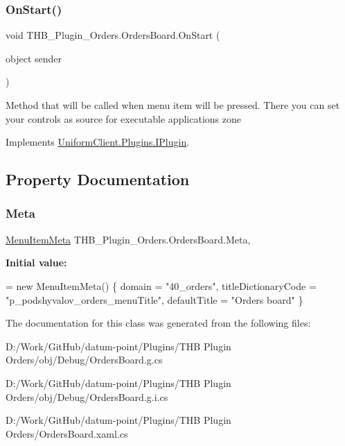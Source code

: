 \subsubsection{\texorpdfstring{On\+Start()}{OnStart()}}
{\footnotesize\ttfamily void T\+H\+B\+\_\+\+Plugin\+\_\+\+Orders.\+Orders\+Board.\+On\+Start (\begin{DoxyParamCaption}\item[{object}]{sender }\end{DoxyParamCaption})}



Method that will be called when menu item will be pressed. There you can set your controls as source for executable application\textquotesingle{}s zone 



Implements \mbox{\hyperlink{interface_uniform_client_1_1_plugins_1_1_i_plugin_a1ca2220c7ce4a23f8f41af10efccf328}{Uniform\+Client.\+Plugins.\+I\+Plugin}}.



\subsection{Property Documentation}
\mbox{\label{class_t_h_b___plugin___orders_1_1_orders_board_a29aa5cbda92c3d6558e51a51c687d4a1}} 
\subsubsection{\texorpdfstring{Meta}{Meta}}
{\footnotesize\ttfamily \mbox{\hyperlink{class_uniform_client_1_1_plugins_1_1_menu_item_meta}{Menu\+Item\+Meta}} T\+H\+B\+\_\+\+Plugin\+\_\+\+Orders.\+Orders\+Board.\+Meta\hspace{0.3cm}{\ttfamily [get]}, {\ttfamily [set]}}

{\bfseries Initial value\+:}
\begin{DoxyCode}
= \textcolor{keyword}{new} MenuItemMeta()
        \{
            domain = \textcolor{stringliteral}{"40\_orders"},
            titleDictionaryCode = \textcolor{stringliteral}{"p\_podshyvalov\_orders\_menuTitle"},
            defaultTitle = \textcolor{stringliteral}{"Orders board"}
        \}
\end{DoxyCode}


The documentation for this class was generated from the following files\+:\begin{DoxyCompactItemize}
\item 
D\+:/\+Work/\+Git\+Hub/datum-\/point/\+Plugins/\+T\+H\+B Plugin Orders/obj/\+Debug/Orders\+Board.\+g.\+cs\item 
D\+:/\+Work/\+Git\+Hub/datum-\/point/\+Plugins/\+T\+H\+B Plugin Orders/obj/\+Debug/Orders\+Board.\+g.\+i.\+cs\item 
D\+:/\+Work/\+Git\+Hub/datum-\/point/\+Plugins/\+T\+H\+B Plugin Orders/Orders\+Board.\+xaml.\+cs\end{DoxyCompactItemize}
